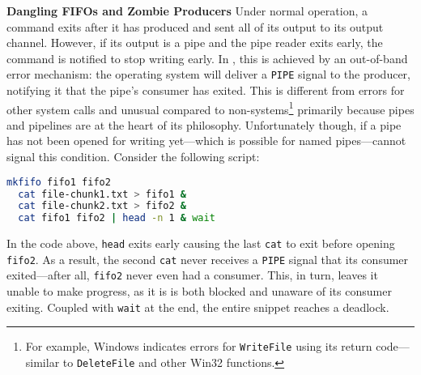 \documentclass[letterpaper,twocolumn,10pt]{article}
\newcommand{\heading}[1]{\vspace{4pt}\noindent\textbf{#1}\enspace}
\newcommand{\ttt}[1]{\texttt{#1}}
\newcommand{\TODO}[1]{\hl{\textbf{TODO:} #1}\xspace}
\newcommand{\nv}[1]{[{\color{cyan}nv: #1}]}
\newcommand{\kk}[1]{[{\color{magenta}kk: #1}]}
\begin{document}
\heading{Dangling FIFOs and Zombie Producers}
%
%
Under normal operation, a command exits after it has produced and sent all of its output to its output channel.
However, if its output is a pipe and the pipe reader exits early, the command is notified to stop writing early.
In \unix, this is achieved by an out-of-band error mechanism: the
operating system will deliver a \ttt{PIPE} signal to the producer,
notifying it that the pipe's consumer has exited.  This is different
from errors for other system calls
and unusual compared to non-\unix systems\footnote{For example,
  Windows indicates errors for \ttt{WriteFile} using its return
  code---similar to \ttt{DeleteFile} and other Win32 functions.}
primarily because pipes and pipelines are at the heart of its
philosophy.
Unfortunately though, if a pipe has not been opened for writing yet---which is possible for named pipes---\unix cannot signal this condition.
Consider the following script:
\begin{lstlisting}[language=sh, numbers=none]
  mkfifo fifo1 fifo2
  cat file-chunk1.txt > fifo1 &
  cat file-chunk2.txt > fifo2 &
  cat fifo1 fifo2 | head -n 1 & wait
\end{lstlisting}
\noindent
In the code above, \ttt{head} exits early causing the last \ttt{cat} to exit before opening \ttt{fifo2}.
As a result, the second \ttt{cat} never receives a \ttt{PIPE} signal that its consumer exited---after all, \ttt{fifo2} never even had a consumer.
This, in turn, leaves it unable to make progress, as it is is both blocked and unaware of its consumer exiting.
Coupled with \ttt{wait} at the end, the entire snippet reaches a deadlock.
\end{document}
